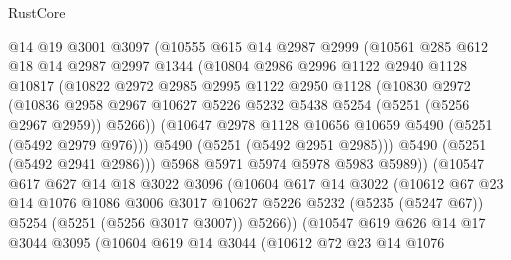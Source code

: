 \begin{lexlean}{RustCore}
\begin{coremodule}
              @14
              @19
              @3001
              @3097
              (@10555
                @615
                @14
                @2987
                @2999
                (@10561
                  @285
                  @612
                  @18
                  @14
                  @2987
                  @2997
                  @1344
                  (@10804
                    @2986
                    @2996
                    @1122
                    @2940
                    @1128
                    @10817
                    (@10822
                      @2972
                      @2985
                      @2995
                      @1122
                      @2950
                      @1128
                      (@10830
                        @2972
                        (@10836
                          @2958
                          @2967
                          @10627
                          @5226
                          @5232
                          @5438
                          @5254
                          (@5251 (@5256 @2967 @2959))
                          @5266))
                      (@10647 @2978 @1128 @10656 @10659 @5490 (@5251 (@5492 @2979 @976)))
                      @5490
                      (@5251 (@5492 @2951 @2985)))
                    @5490
                    (@5251 (@5492 @2941 @2986)))
                  @5968
                  @5971
                  @5974
                  @5978
                  @5983
                  @5989))
              (@10547
                @617
                @627
                @14
                @18
                @3022
                @3096
                (@10604
                  @617
                  @14
                  @3022
                  (@10612
                    @67
                    @23
                    @14
                    @1076
                    @1086
                    @3006
                    @3017
                    @10627
                    @5226
                    @5232
                    (@5235 (@5247 @67))
                    @5254
                    (@5251 (@5256 @3017 @3007))
                    @5266))
                (@10547
                  @619
                  @626
                  @14
                  @17
                  @3044
                  @3095
                  (@10604
                    @619
                    @14
                    @3044
                    (@10612
                      @72
                      @23
                      @14
                      @1076

\end{coremodule}
\end{lexlean}
